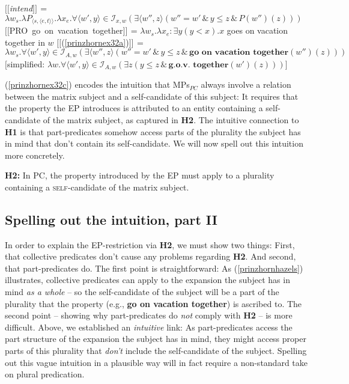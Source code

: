 \documentclass[output=paper,colorlinks,citecolor=brown,
]{langscibook}
\newcommand{\sem}[2]{\mbox{$[\![${#2}$]\!]^{#1}$}} %
\begin{document}
\ea 	\label{prinzhornhazels}
 \label{prinzhornex32a}
\ex   \sem{}{\textit{intend}} = $\lambda w_{s}. \lambda P_{\langle s,\langle e,t \rangle \rangle}. \lambda x_{e}. \forall \langle w' ,y \rangle \in \mathcal{I}_{x,w} (\exists \langle w'', z \rangle (w'' = w' \, \& \, y \le z\, \& \,P(w'')(z)))$ \label{prinzhornex32b}
\ex \sem{}{PRO go on vacation together} = $\lambda w_{s}. \lambda x_{e}: \exists y (y < x). x$ goes on vacation together in $w$\label{prinzhornex32c}
\ex   \sem{}{(\ref{prinzhornex32a})} = $\lambda w_{s}. \forall \langle w' ,y \rangle \in \mathcal{I}_{A,w} (\exists \langle w'', z \rangle (w'' = w' \, \& \, y \le z\, \& \,\textbf{go on vacation together} (w'')(z)))$ \\
$[$simplified: $\lambda w. \forall \langle w' ,y \rangle \in \mathcal{I}_{A,w} (\exists z (y \le z\, \& \,\textbf{g.o.v. together} (w')(z)))]$ \label{prinzhornex32d}
\z\z

(\ref{prinzhornex32c}) encodes the intuition that MPs$_{PC}$ always involve a relation between the matrix subject and a self-candidate of this subject: It requires that  the property  the EP introduces is attributed to an entity containing a self-candidate of the matrix subject, as captured in \textbf{H2}. The intuitive connection to \textbf{H1} is that part-predicates somehow access parts of the plurality the subject has in mind that don't contain its self-candidate. We will now spell out this intuition more concretely.


\ea \textbf{H2:} In PC, the property introduced by the EP must apply to a plurality containing a \textsc{self}-candidate of the matrix subject. \label{prinzhornexr2} \z









\subsection{Spelling out the intuition, part II}\label{prinzhornsec:4.2}

In order to explain the EP-restriction via \textbf{H2}, we must show two things: First,  that collective predicates don't cause any problems regarding \textbf{H2}. And second, that part-predicates do. The first point is straightforward: As (\ref{prinzhornhazels}) illustrates, collective predicates can apply to the expansion the subject has in mind \textit{as a whole} -- so  the self-candidate of the subject will  be a part of the plurality that the property (e.g., \textbf{go on vacation together})  is ascribed to. The second point -- showing why part-predicates do \textit{not}  comply with \textbf{H2} -- is more difficult. Above, we established an \textit{intuitive} link: As part-predicates access the part structure of the expansion the subject has in mind, they might access proper parts of this plurality that \textit{don't} include the self-candidate of the subject. Spelling out this vague intuition in a plausible way will in fact require a non-standard take on plural predication.
\end{document}
